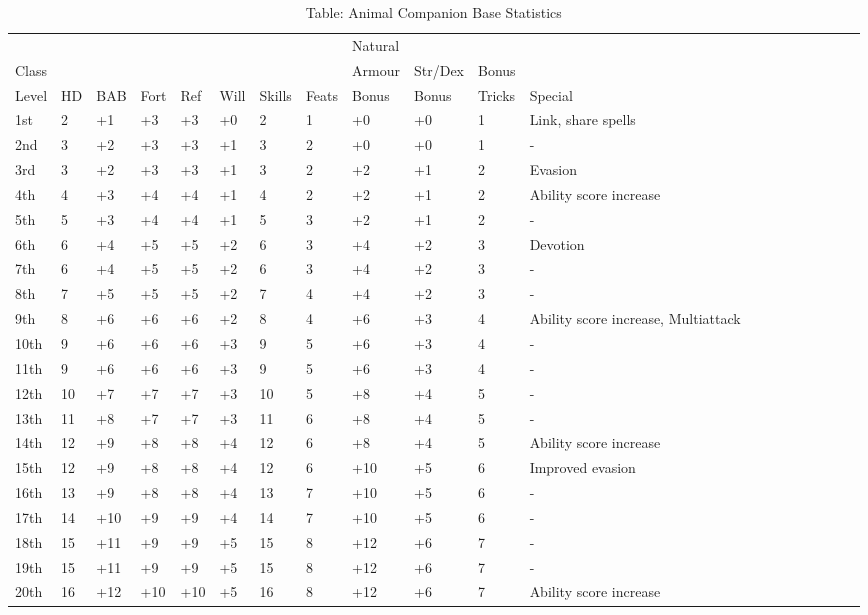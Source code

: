 
\begin{table}[]
\sffamily
\caption{Table: Animal Companion Base Statistics}
\setlength{\tabcolsep}{1pt}
\begin{tabular}{llllllllllllllllllll}
      &    &     &      &     &      &        &       & Natural &         &        & \\
Class &    &     &      &     &      &        &       & Armour  & Str/Dex & Bonus  & \\
Level & HD & BAB & Fort & Ref & Will & Skills & Feats & Bonus   & Bonus   & Tricks & Special \\
\hline
1st & 2 & +1 & +3 & +3 & +0 & 2 & 1 & +0 & +0 & 1 & Link, share spells \\
2nd & 3 & +2 & +3 & +3 & +1 & 3 & 2 & +0 & +0 & 1 & - \\
3rd & 3 & +2 & +3 & +3 & +1 & 3 & 2 & +2 & +1 & 2 & Evasion \\
4th & 4 & +3 & +4 & +4 & +1 & 4 & 2 & +2 & +1 & 2 & Ability score increase \\
 5th & 5 & +3 & +4 & +4 & +1 & 5 & 3 & +2 & +1 & 2 & - \\
 6th & 6 & +4 & +5 & +5 & +2 & 6 & 3 & +4 & +2 & 3 & Devotion \\
 7th & 6 & +4 & +5 & +5 & +2 & 6 & 3 & +4 & +2 & 3 & - \\
 8th & 7 & +5 & +5 & +5 & +2 & 7 & 4 & +4 & +2 & 3 & - \\
 9th & 8 & +6 & +6 & +6 & +2 & 8 & 4 & +6 & +3 & 4 & Ability score increase, Multiattack \\
 10th & 9 & +6 & +6 & +6 & +3 & 9 & 5 & +6 & +3 & 4 & - \\
 11th & 9 & +6 & +6 & +6 & +3 & 9 & 5 & +6 & +3 & 4 & - \\
 12th & 10 & +7 & +7 & +7 & +3 & 10 & 5 & +8 & +4 & 5 & - \\
 13th & 11 & +8 & +7 & +7 & +3 & 11 & 6 & +8 & +4 & 5 & - \\
 14th & 12 & +9 & +8 & +8 & +4 & 12 & 6 & +8 & +4 & 5 & Ability score increase \\
 15th & 12 & +9 & +8 & +8 & +4 & 12 & 6 & +10 & +5 & 6 & Improved evasion \\
 16th & 13 & +9 & +8 & +8 & +4 & 13 & 7 & +10 & +5 & 6 & - \\
 17th & 14 & +10 & +9 & +9 & +4 & 14 & 7 & +10 & +5 & 6 & - \\
 18th & 15 & +11 & +9 & +9 & +5 & 15 & 8 & +12 & +6 & 7 & - \\
 19th & 15 & +11 & +9 & +9 & +5 & 15 & 8 & +12 & +6 & 7 & - \\
 20th & 16 & +12 & +10 & +10 & +5 & 16 & 8 & +12 & +6 & 7 & Ability score increase\\
\end{tabular}
\end{table}

